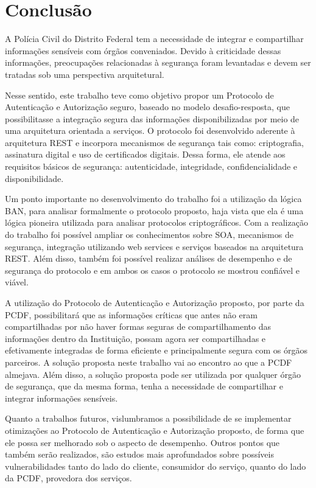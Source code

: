 \chapter{Conclusão}%

A Polícia Civil do Distrito Federal tem a necessidade de integrar e compartilhar informações sensíveis com órgãos conveniados. Devido à criticidade dessas informações, preocupações relacionadas à segurança foram levantadas e devem ser tratadas sob uma perspectiva arquitetural.

Nesse sentido, este trabalho teve como objetivo propor um Protocolo de Autenticação e Autorização seguro, baseado no modelo desafio-resposta, que possibilitasse a integração segura das informações disponibilizadas por meio de uma arquitetura orientada a serviços. O protocolo foi desenvolvido aderente à arquitetura REST e incorpora mecanismos de segurança tais como: criptografia, assinatura digital e uso de certificados digitais. Dessa forma, ele atende aos requisitos básicos de segurança: autenticidade, integridade, confidencialidade e disponibilidade.

Um ponto importante no desenvolvimento do trabalho foi a utilização da lógica BAN, para analisar formalmente o  protocolo proposto, haja vista que ela é uma lógica pioneira utilizada para analisar protocolos criptográficos. Com a realização do trabalho foi possível ampliar os conhecimentos sobre SOA, mecanismos de segurança, integração utilizando web services e serviços baseados na arquitetura REST. Além disso, também foi possível realizar análises de desempenho e de segurança do protocolo e em ambos os casos o protocolo se mostrou confiável e viável.

A utilização do Protocolo de Autenticação e Autorização proposto, por parte da PCDF, possibilitará que as informações críticas que antes não eram compartilhadas por não haver formas seguras de compartilhamento das informações dentro da Instituição, possam agora ser compartilhadas e efetivamente integradas de forma eficiente e principalmente segura com os órgãos parceiros. A solução proposta neste trabalho vai ao encontro ao que a PCDF almejava. Além disso, a solução proposta pode ser utilizada por qualquer órgão de segurança, que da mesma forma, tenha a necessidade de compartilhar e integrar informações sensíveis.

Quanto a trabalhos futuros, vislumbramos a possibilidade de se implementar otimizações ao Protocolo de Autenticação e Autorização proposto, de forma que ele possa ser melhorado sob o aspecto de desempenho. Outros pontos que também serão realizados, são estudos mais aprofundados sobre possíveis vulnerabilidades tanto do lado do cliente, consumidor do serviço,  quanto do lado da PCDF, provedora dos serviços.

